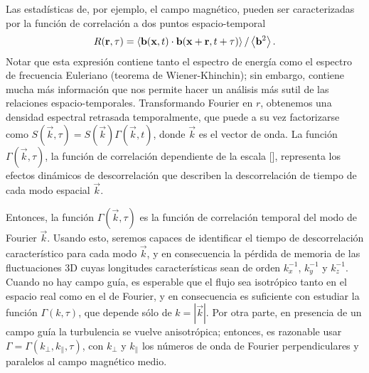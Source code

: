 Las estadísticas de, por ejemplo, el campo magnético, pueden ser
caracterizadas por la función de correlación a dos puntos
espacio-temporal
\begin{equation}
R(\vec{r},\tau) = \left\langle \vec{b}( \vec{x},t) \cdot
  \vec{b}( \vec{x} + \vec{r},t+\tau) \right\rangle / \left\langle {\bf
    b}^2 \right\rangle.
\label{eq3:Rbij}
\end{equation}
Notar que esta expresión contiene tanto el espectro de energía como el
espectro de frecuencia Euleriano (teorema de Wiener-Khinchin); sin
embargo, contiene mucha más información que nos permite hacer un
análisis más sutil de las relaciones espacio-temporales.
Transformando Fourier en $r$, obtenemos una densidad espectral
retrasada temporalmente, que puede a su vez factorizarse como
$S(\vec{k},\tau) = S(\vec{k})\Gamma(\vec{k},t)$, donde $\vec{k}$ es el
vector de onda. La función $\Gamma(\vec{k},\tau)$, la función de
correlación dependiente de la escala [\cite{heisenberg_zur_1948,
comte-bellot_simple_1971, orszag_numerical_1972}], representa los
efectos dinámicos de descorrelación que describen la descorrelación de
tiempo de cada modo espacial $\vec{k}$.

Entonces, la función $\Gamma(\vec{k},\tau)$ es la función de
correlación temporal del modo de Fourier $\vec{k}$. Usando esto,
seremos capaces de identificar el tiempo de descorrelación
característico para cada modo $\vec{k}$, y en consecuencia la pérdida
de memoria de las fluctuaciones 3D cuyas longitudes características
sean de orden $k_x^{-1}$, $k_y^{-1}$ y $k_z^{-1}$. Cuando no hay campo
guía, es esperable que el flujo sea isotrópico tanto en el espacio
real como en el de Fourier, y en consecuencia es suficiente con
estudiar la función $\Gamma(k,\tau)$, que depende sólo de
$k=|\vec{k}|$. Por otra parte, en presencia de un campo guía la
turbulencia se vuelve anisotrópica; entonces, es razonable usar
$\Gamma = \Gamma(k_\perp,k_\parallel,\tau)$, con $k_\perp$ y
$k_\parallel$ los números de onda de Fourier perpendiculares y
paralelos al campo magnético medio.


